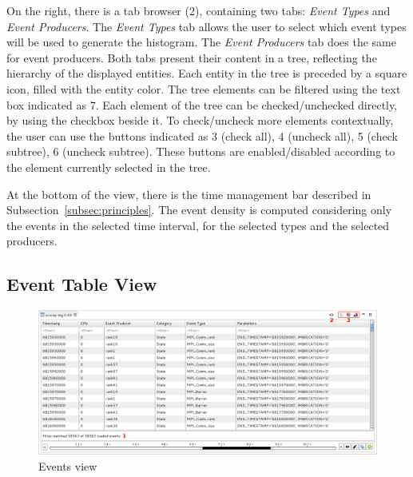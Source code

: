 \documentclass[twoside]{article}
\begin{document}
\begin{sloppypar}
On the right, there is a tab browser (\num{2}), containing two tabs: \emph{Event Types} and \emph{Event Producers}. 
The \emph{Event Types} tab allows the user to select which event types will be used to generate the histogram. 
The \emph{Event Producers} tab does the same for event producers. 
Both tabs present their content in a tree, reflecting the hierarchy of the displayed entities. 
Each entity in the tree is preceded by a square icon, filled with the entity color.
The tree elements can be filtered using the text box indicated as \num{7}. 
Each element of the tree can be checked/unchecked directly, by using the checkbox beside it.
To check/uncheck more elements contextually, the user can use the buttons indicated as \num{3} (check all), \num{4} (uncheck all), \num{5} (check subtree), \num{6} (uncheck subtree).
These buttons are enabled/disabled according to the element currently selected in the tree.

At the bottom of the view, there is the time management bar described in Subsection~\ref{subsec:principles}.
The event density is computed considering only the events in the selected time interval, for the selected types and the selected producers.

\subsection{Event Table View}
\label{subsec:table}

\begin{figure}[h!]
  \centering
    \includegraphics[width=1.0\textwidth]{images/table.png}
  \caption{Events view}
  \label{fig:table}
\end{figure}


\end{sloppypar}
\end{document}
